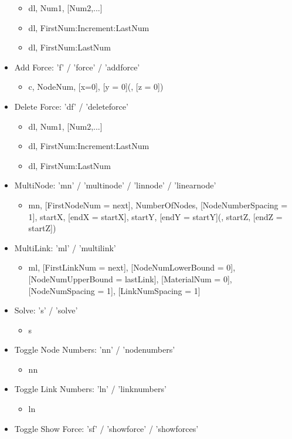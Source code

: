 \documentclass[11pt, oneside]{article}   	%
\begin{document}
\begin{itemize}
 	\begin{itemize}
 		\item dl, Num1, [Num2,...]
		\item dl, FirstNum:Increment:LastNum
		\item dl, FirstNum:LastNum
	\end{itemize}
\item{Add Force: 'f' / 'force' / 'addforce'}
	\begin{itemize}
		\item c, NodeNum, [x=0], [y = 0](, [z = 0])
	\end{itemize}
\item{Delete Force: 'df' / 'deleteforce'}
 	\begin{itemize}
 		\item dl, Num1, [Num2,...]
		\item dl, FirstNum:Increment:LastNum
		\item dl, FirstNum:LastNum
	\end{itemize}
\item{MultiNode: 'mn' / 'multinode' / 'linnode' / 'linearnode'}
	\begin{itemize}
		\item mn, [FirstNodeNum = next], NumberOfNodes, [NodeNumberSpacing = 1], startX, [endX = startX], startY, [endY = startY](, startZ, [endZ = startZ])
	\end{itemize}
\item{MultiLink: 'ml' / 'multilink'}
	\begin{itemize}
		\item ml, [FirstLinkNum = next], [NodeNumLowerBound = 0], [NodeNumUpperBound = lastLink], [MaterialNum = 0], [NodeNumSpacing = 1], [LinkNumSpacing = 1]
	\end{itemize}
\item{Solve: 's' / 'solve'}
	\begin{itemize}
		\item s
	\end{itemize}
\item{Toggle Node Numbers: 'nn' / 'nodenumbers'}
	\begin{itemize}
		\item nn
	\end{itemize}
\item{Toggle Link Numbers: 'ln' / 'linknumbers'}
	\begin{itemize}
		\item ln
	\end{itemize}
\item{Toggle Show Force: 'sf' / 'showforce' / 'showforces'}

\end{itemize}
\end{document}

